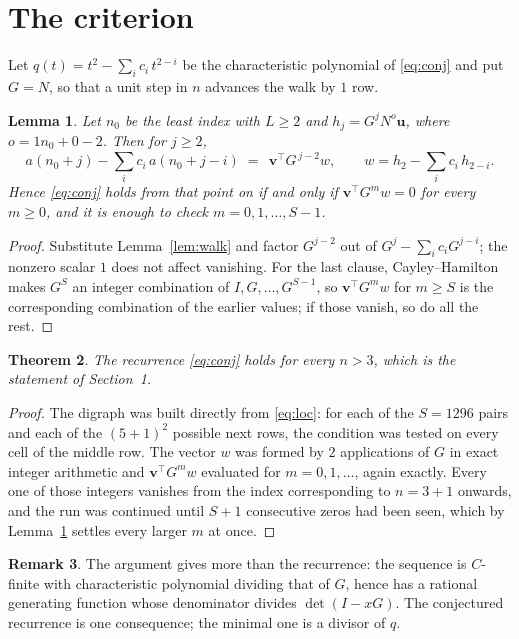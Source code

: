 \documentclass[11pt,a4paper]{article}
\theoremstyle{plain}
\newtheorem{theorem}{Theorem}
\newtheorem{lemma}[theorem]{Lemma}
\theoremstyle{definition}
\newtheorem{remark}[theorem]{Remark}
\begin{document}
\section{The criterion}

Let $q(t)=t^{2}-\sum_i c_i\,t^{2-i}$ be the characteristic polynomial of
\eqref{eq:conj} and put $G=N$, so that a unit step in $n$ advances the walk by
$1$ row.

\begin{lemma}\label{lem:crit}
Let $n_0$ be the least index with $L\ge2$ and $h_j=G^{j}N^{o}\mathbf{u}$, where
$o=1n_0+0-2$. Then for $j\ge2$,
\[
a(n_0+j)-\sum_i c_i\,a(n_0+j-i)\;=\;\,\mathbf{v}^{\!\top}G^{\,j-2}w,
\qquad w=h_{2}-\sum_i c_i\,h_{2-i} .
\]
Hence \eqref{eq:conj} holds from that point on if and only if
$\mathbf{v}^{\!\top}G^{m}w=0$ for every $m\ge0$, and it is enough to check
$m=0,1,\dots,S-1$.
\end{lemma}

\begin{proof}
Substitute Lemma~\ref{lem:walk} and factor $G^{j-2}$ out of
$G^{j}-\sum_ic_iG^{j-i}$; the nonzero scalar $1$ does not affect
vanishing. For the last clause, Cayley--Hamilton makes $G^{S}$ an integer combination of
$I,G,\dots,G^{S-1}$, so $\mathbf{v}^{\!\top}G^{m}w$ for $m\ge S$ is the corresponding
combination of the earlier values; if those vanish, so do all the rest.
\end{proof}

\begin{theorem}
The recurrence \eqref{eq:conj} holds for every $n>3$, which is the statement of
Section~1.
\end{theorem}

\begin{proof}
The digraph was built directly from \eqref{eq:loc}: for each of the $S=1296$ pairs and each
of the $(5+1)^{2}$ possible next rows, the condition was tested on every cell of
the middle row. The vector $w$ was formed by $2$ applications of $G$ in exact integer
arithmetic and $\mathbf{v}^{\!\top}G^{m}w$ evaluated for $m=0,1,\dots$, again exactly.
Every one of those integers vanishes from the index corresponding to $n=3+1$ onwards,
and the run was continued until $S+1$ consecutive zeros had been seen, which by
Lemma~\ref{lem:crit} settles every larger $m$ at once.
\end{proof}

\begin{remark}
The argument gives more than the recurrence: the sequence is $C$-finite with characteristic
polynomial dividing that of $G$, hence has a rational generating function whose denominator
divides $\det(I-xG)$. The conjectured recurrence is one consequence; the minimal one is a
divisor of $q$.
\end{remark}
\end{document}
